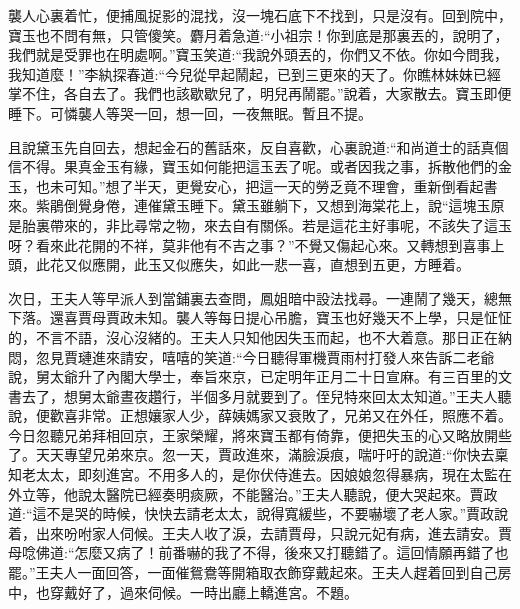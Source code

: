 \begin{parag}
    襲人心裏着忙，便捕風捉影的混找，沒一塊石底下不找到，只是沒有。回到院中，寶玉也不問有無，只管傻笑。麝月着急道:“小祖宗！你到底是那裏丟的，說明了，我們就是受罪也在明處啊。”寶玉笑道:“我說外頭丟的，你們又不依。你如今問我，我知道麼！”李紈探春道:“今兒從早起鬧起，已到三更來的天了。你瞧林妹妹已經掌不住，各自去了。我們也該歇歇兒了，明兒再鬧罷。”說着，大家散去。寶玉即便睡下。可憐襲人等哭一回，想一回，一夜無眠。暫且不提。
\end{parag}


\begin{parag}
    且說黛玉先自回去，想起金石的舊話來，反自喜歡，心裏說道:“和尚道士的話真個信不得。果真金玉有緣，寶玉如何能把這玉丟了呢。或者因我之事，拆散他們的金玉，也未可知。”想了半天，更覺安心，把這一天的勞乏竟不理會，重新倒看起書來。紫鵑倒覺身倦，連催黛玉睡下。黛玉雖躺下，又想到海棠花上，說“這塊玉原是胎裏帶來的，非比尋常之物，來去自有關係。若是這花主好事呢，不該失了這玉呀？看來此花開的不祥，莫非他有不吉之事？”不覺又傷起心來。又轉想到喜事上頭，此花又似應開，此玉又似應失，如此一悲一喜，直想到五更，方睡着。
\end{parag}


\begin{parag}
    次日，王夫人等早派人到當鋪裏去查問，鳳姐暗中設法找尋。一連鬧了幾天，總無下落。還喜賈母賈政未知。襲人等每日提心吊膽，寶玉也好幾天不上學，只是怔怔的，不言不語，沒心沒緒的。王夫人只知他因失玉而起，也不大着意。那日正在納悶，忽見賈璉進來請安，嘻嘻的笑道:“今日聽得軍機賈雨村打發人來告訴二老爺說，舅太爺升了內閣大學士，奉旨來京，已定明年正月二十日宣麻。有三百里的文書去了，想舅太爺晝夜趲行，半個多月就要到了。侄兒特來回太太知道。”王夫人聽說，便歡喜非常。正想孃家人少，薛姨媽家又衰敗了，兄弟又在外任，照應不着。今日忽聽兄弟拜相回京，王家榮耀，將來寶玉都有倚靠，便把失玉的心又略放開些了。天天專望兄弟來京。忽一天，賈政進來，滿臉淚痕，喘吁吁的說道:“你快去稟知老太太，即刻進宮。不用多人的，是你伏侍進去。因娘娘忽得暴病，現在太監在外立等，他說太醫院已經奏明痰厥，不能醫治。”王夫人聽說，便大哭起來。賈政道:“這不是哭的時候，快快去請老太太，說得寬緩些，不要嚇壞了老人家。”賈政說着，出來吩咐家人伺候。王夫人收了淚，去請賈母，只說元妃有病，進去請安。賈母唸佛道:“怎麼又病了！前番嚇的我了不得，後來又打聽錯了。這回情願再錯了也罷。”王夫人一面回答，一面催鴛鴦等開箱取衣飾穿戴起來。王夫人趕着回到自己房中，也穿戴好了，過來伺候。一時出廳上轎進宮。不題。
\end{parag}


